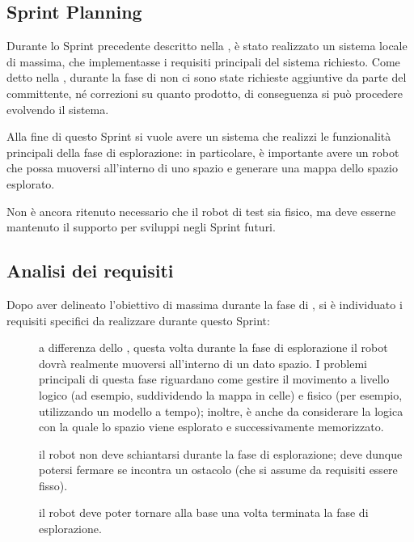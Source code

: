 
\subsection{Sprint Planning}

Durante lo Sprint precedente descritto nella , è stato realizzato un sistema locale di massima, che implementasse i requisiti principali del sistema richiesto.
Come detto nella , durante la fase di  non ci sono state richieste aggiuntive da parte del committente, né correzioni su quanto prodotto, di conseguenza si può procedere evolvendo il sistema.

Alla fine di questo Sprint si vuole avere un sistema che realizzi le funzionalità principali della fase di esplorazione:
in particolare, è importante avere un robot che possa muoversi all'interno di uno spazio e generare una mappa dello spazio esplorato.

Non è ancora ritenuto necessario che il robot di test sia fisico, ma deve esserne mantenuto il supporto per sviluppi negli Sprint futuri.

\subsection{Analisi dei requisiti}

Dopo aver delineato l'obiettivo di massima durante la fase di , si è individuato i requisiti specifici da realizzare durante questo Sprint:

\begin{description}
  \item[]
    a differenza dello , questa volta durante la fase di esplorazione il robot dovrà realmente muoversi all'interno di un dato spazio.
    I problemi principali di questa fase riguardano come gestire il movimento a livello logico (ad esempio, suddividendo la mappa in celle) e fisico (per esempio, utilizzando un modello a tempo);
    inoltre, è anche da considerare la logica con la quale lo spazio viene esplorato e successivamente memorizzato.

  \item[]
    il robot non deve schiantarsi durante la fase di esplorazione;
    deve dunque potersi fermare se incontra un ostacolo (che si assume da requisiti essere fisso).

  \item[]
    il robot deve poter tornare alla base una volta terminata la fase di esplorazione.
\end{description}

